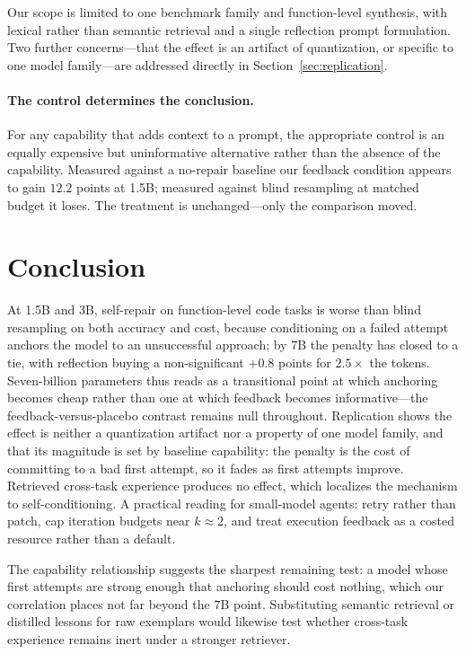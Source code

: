 Our scope is limited to one benchmark family and function-level synthesis,
with lexical rather than semantic retrieval and a single reflection prompt
formulation. Two further concerns---that the effect is an artifact of
quantization, or specific to one model family---are addressed directly in
Section~\ref{sec:replication}.

\paragraph{The control determines the conclusion.}
For any capability that adds context to a prompt, the appropriate control is an
equally expensive but uninformative alternative rather than the absence of the
capability. Measured against a no-repair baseline our feedback condition appears
to gain $12.2$ points at 1.5B; measured against blind resampling at matched
budget it loses. The treatment is unchanged---only the comparison moved.

\section{Conclusion}
\label{sec:conclusion}

At 1.5B and 3B, self-repair on function-level code tasks is worse than blind
resampling on both accuracy and cost, because conditioning on a failed attempt
anchors the model to an unsuccessful approach; by 7B the penalty has closed to
a tie, with reflection buying a non-significant $+0.8$ points for
$2.5\times$ the tokens. Seven-billion parameters thus reads as a transitional
point at which anchoring becomes cheap rather than one at which feedback
becomes informative---the feedback-versus-placebo contrast remains null
throughout. Replication shows the effect is neither a quantization artifact nor
a property of one model family, and that its magnitude is set by baseline
capability: the penalty is the cost of committing to a bad first attempt, so it
fades as first attempts improve. Retrieved cross-task experience produces no
effect, which localizes the mechanism to self-conditioning. A practical reading
for small-model agents:
retry rather than patch, cap iteration budgets near $k{\approx}2$, and treat
execution feedback as a costed resource rather than a default.

The capability relationship suggests the sharpest remaining test: a model whose
first attempts are strong enough that anchoring should cost nothing, which our
correlation places not far beyond the 7B point. Substituting semantic retrieval
or distilled lessons for raw exemplars would likewise test whether cross-task
experience remains inert under a stronger retriever.
